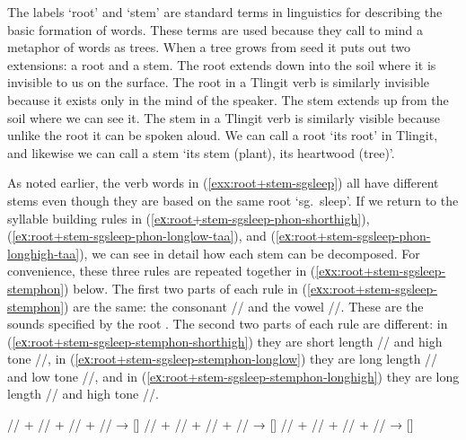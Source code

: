 The labels ‘root’ and ‘stem’ are standard terms in linguistics for describing the basic formation of words.
These terms are used because they call to mind a metaphor of words as trees.
When a tree grows from seed it puts out two extensions: a root and a stem.
The root extends down into the soil where it is invisible to us on the surface.
The root in a Tlingit verb is similarly invisible because it exists only in the mind of the speaker.
The stem extends up from the soil where we can see it.
The stem in a Tlingit verb is similarly visible because unlike the root it can be spoken aloud.
We can call a root  ‘its root’ in Tlingit, and likewise we can call a stem  ‘its stem (plant), its heartwood (tree)’.

As noted earlier, the verb words in (\ref{exx:root+stem-sgsleep}) all have different stems even though they are based on the same root  ‘sg.\ sleep’.
If we return to the syllable building rules in (\ref{eх:root+stem-sgsleep-phon-shorthigh}), (\ref{eх:root+stem-sgsleep-phon-longlow-taa}), and (\ref{eх:root+stem-sgsleep-phon-longhigh-taa}), we can see in detail how each stem can be decomposed.
For convenience, these three rules are repeated together in (\ref{eхx:root+stem-sgsleep-stemphon}) below.
The first two parts of each rule in (\ref{eхx:root+stem-sgsleep-stemphon}) are the same: the consonant // and the vowel //.
These are the sounds specified by the root .
The second two parts of each rule are different: in (\ref{eх:root+stem-sgsleep-stemphon-shorthigh}) they are short length // and high tone //, in (\ref{eх:root+stem-sgsleep-stemphon-longlow}) they are long length // and low tone //, and in (\ref{eх:root+stem-sgsleep-stemphon-longhigh}) they are long length // and high tone //.

\pex\label{eхx:root+stem-sgsleep-stemphon}%
\a\label{eх:root+stem-sgsleep-stemphon-shorthigh}%
%
	// + // + // + //
	→ []
\a\label{eх:root+stem-sgsleep-stemphon-longlow}%
%
	// + // + // + //
	→ []
\a\label{eх:root+stem-sgsleep-stemphon-longhigh}%
%
	// + // + // + //
	→ []
\xe


